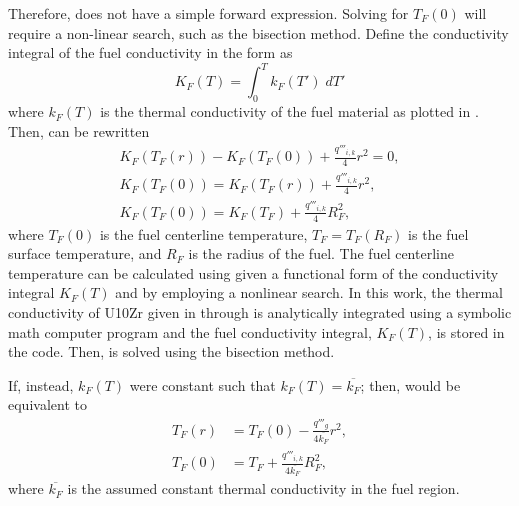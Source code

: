       Therefore,  does not have a simple forward
      expression. Solving for $T_F(0)$ will require a non-linear search, such as
      the bisection method. Define the conductivity integral of the fuel
      conductivity in the form as
      \begin{equation}
        \label{eq:conductivity_integral}
        K_F(T) = \int_0^T k_F(T') \; dT'
      \end{equation}
      where $k_F(T)$ is the thermal conductivity of the fuel material as plotted
      in . Then,  can be rewritten
      \begin{gather}
        K_F(T_F(r)) - K_F(T_F(0)) + \frac{q'''_{i,k}}{4} r^2 = 0, \\
        \label{eq:tfuel_r}
        K_F(T_F(0)) = K_F(T_F(r)) + \frac{q'''_{i,k}}{4} r^2, \\
        \label{eq:tcl_conductivity_integral}
        K_F(T_F(0)) = K_F(T_F) + \frac{q'''_{i,k}}{4} R_F^2,
      \end{gather}
      where $T_F(0)$ is the fuel centerline temperature, $T_F=T_F(R_F)$ is the
      fuel surface temperature, and $R_F$ is the radius of the fuel. The fuel
      centerline temperature can be calculated using
       given a functional form of the
      conductivity integral $K_F(T)$ and by employing a nonlinear search. In
      this work, the thermal conductivity of U10Zr given in
       through  is analytically
      integrated using a symbolic math computer program and the fuel 
      conductivity integral, $K_F(T)$, is stored in the code. Then,
       is solved using the bisection method.

      If, instead, $k_F(T)$ were constant such that $k_F(T) = \overline{k_F}$;
      then,  would be equivalent to 
      \begin{align}
        \label{eq:tfr}
        T_F(r) &= T_F(0) - \frac{q'''_g}{4 \overline{k_F}} r^2, \\
        \label{eq:tcl_constant_kfuel}
        T_F(0) &= T_F + \frac{q'''_{i,k}}{4 \overline{k_F}} R_F^2,
      \end{align}
      where $\overline{k_F}$ is the assumed constant thermal conductivity in the 
      fuel region.

